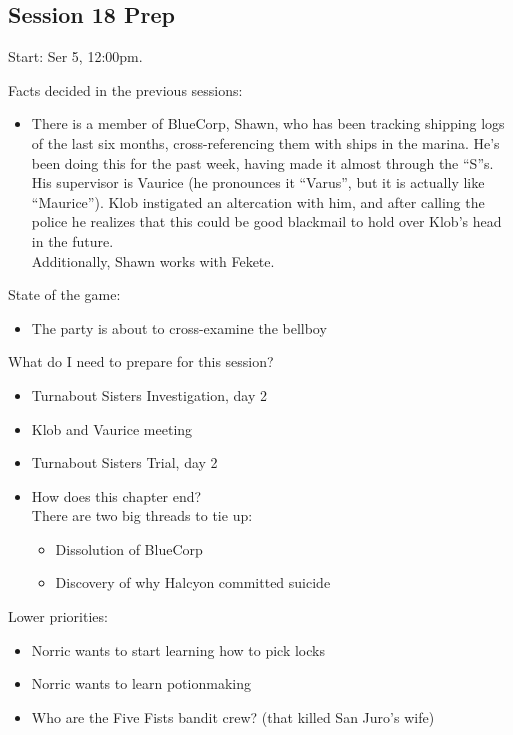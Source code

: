 \subsection{Session 18 Prep}
Start: Ser 5, 12:00pm.

Facts decided in the previous sessions:
\begin{itemize}
\item There is a member of BlueCorp, Shawn, who has been tracking shipping logs of the last six months, cross-referencing them with ships in the marina. He's been doing this for the past week, having made it almost through the ``S''s. His supervisor is Vaurice (he pronounces it ``Varus'', but it is actually like ``Maurice''). Klob instigated an altercation with him, and after calling the police he realizes that this could be good blackmail to hold over Klob's head in the future.\\
Additionally, Shawn works with Fekete.
\end{itemize}

State of the game:
\begin{itemize}
\item The party is about to cross-examine the bellboy
\end{itemize}

What do I need to prepare for this session?
\begin{itemize}
\item Turnabout Sisters Investigation, day 2
\item Klob and Vaurice meeting
\item Turnabout Sisters Trial, day 2
\item How does this chapter end?\\
There are two big threads to tie up:
\begin{itemize}
 \item Dissolution of BlueCorp
 \item Discovery of why Halcyon committed suicide
\end{itemize}
\end{itemize}

Lower priorities:
\begin{itemize}
\item Norric wants to start learning how to pick locks
\item Norric wants to learn potionmaking
\item Who are the Five Fists bandit crew? (that killed San Juro's wife)
\end{itemize}



